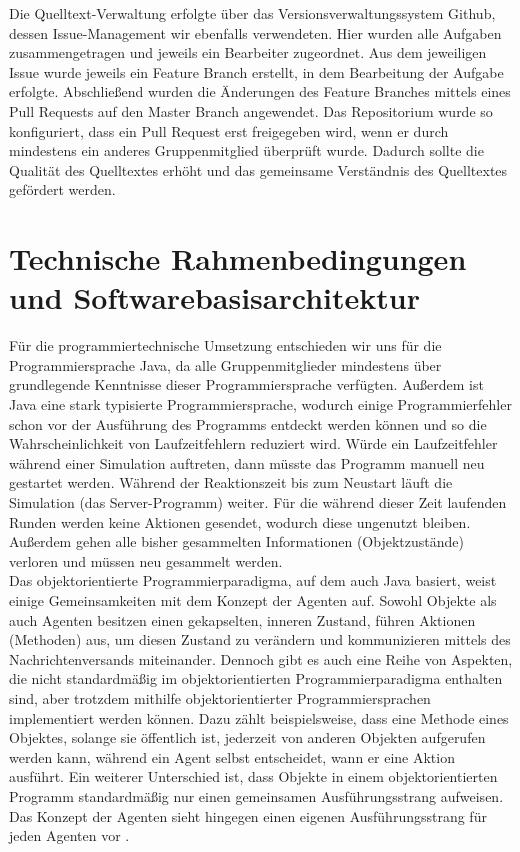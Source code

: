 \documentclass[runningheads]{llncs}
\begin{document}
Die Quelltext-Verwaltung erfolgte über das Versionsverwaltungssystem Github, dessen Issue-Management wir ebenfalls verwendeten. Hier wurden alle Aufgaben zusammengetragen und jeweils ein Bearbeiter zugeordnet. Aus dem jeweiligen Issue wurde jeweils ein Feature Branch erstellt, in dem Bearbeitung der Aufgabe erfolgte. Abschließend wurden die Änderungen des Feature Branches mittels eines Pull Requests auf den Master Branch angewendet. Das Repositorium wurde so konfiguriert, dass ein Pull Request erst freigegeben wird, wenn er durch mindestens ein anderes Gruppenmitglied überprüft wurde. Dadurch sollte die Qualität des Quelltextes erhöht und das gemeinsame Verständnis des Quelltextes gefördert werden.


\section{Technische Rahmenbedingungen und Softwarebasisarchitektur}
Für die programmiertechnische Umsetzung entschieden wir uns für die Programmiersprache Java, da alle Gruppenmitglieder mindestens über grundlegende Kenntnisse dieser Programmiersprache verfügten. Außerdem ist Java eine stark typisierte Programmiersprache, wodurch einige Programmierfehler schon vor der Ausführung des Programms entdeckt werden können und so die Wahrscheinlichkeit von Laufzeitfehlern reduziert wird. Würde ein Laufzeitfehler während einer Simulation auftreten, dann müsste das Programm manuell neu gestartet werden. Während der Reaktionszeit bis zum Neustart läuft die Simulation (das Server-Programm) weiter. Für die während dieser Zeit laufenden Runden werden keine Aktionen gesendet, wodurch diese ungenutzt bleiben. Außerdem gehen alle bisher gesammelten Informationen (Objektzustände) verloren und müssen neu gesammelt werden.\\

Das objektorientierte Programmierparadigma, auf dem auch Java basiert, weist einige Gemeinsamkeiten mit dem Konzept der Agenten auf. Sowohl Objekte als auch Agenten besitzen einen gekapselten, inneren Zustand, führen Aktionen (Methoden) aus, um diesen Zustand zu verändern und kommunizieren mittels des Nachrichtenversands miteinander. Dennoch gibt es auch eine Reihe von Aspekten, die nicht standardmäßig im objektorientierten Programmierparadigma enthalten sind, aber trotzdem mithilfe objektorientierter Programmiersprachen implementiert werden können. Dazu zählt beispielsweise, dass eine Methode eines Objektes, solange sie öffentlich ist, jederzeit von anderen Objekten aufgerufen werden kann, während ein Agent selbst entscheidet, wann er eine Aktion ausführt. Ein weiterer Unterschied ist, dass Objekte in einem objektorientierten Programm standardmäßig nur einen gemeinsamen Ausführungsstrang aufweisen. Das Konzept der Agenten sieht hingegen einen eigenen Ausführungsstrang für jeden Agenten vor \cite{Weiss2000}.\\
\end{document}
